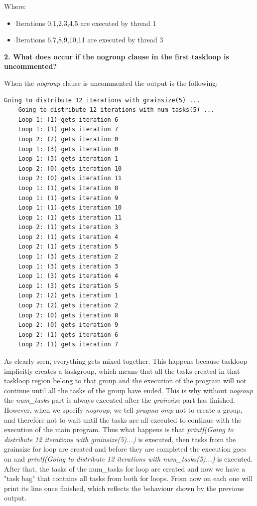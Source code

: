 \documentclass[12]{article}
\begin{document}
\begin{itemize}
    Where:
    \begin{itemize}
        \item Iterations 0,1,2,3,4,5 are executed by thread 1
        \item Iterations 6,7,8,9,10,11 are executed by thread 3
    \end{itemize}
\end{itemize}

\textbf{2. What does occur if the nogroup clause in the first taskloop is uncommented?}

When the \textit{nogroup} clause is uncommented the output is the following:

\begin{lstlisting}[frame=single]
    Going to distribute 12 iterations with grainsize(5) ...
    Going to distribute 12 iterations with num_tasks(5) ...
    Loop 1: (1) gets iteration 6
    Loop 1: (1) gets iteration 7
    Loop 2: (2) gets iteration 0
    Loop 1: (3) gets iteration 0
    Loop 1: (3) gets iteration 1
    Loop 2: (0) gets iteration 10
    Loop 2: (0) gets iteration 11
    Loop 1: (1) gets iteration 8
    Loop 1: (1) gets iteration 9
    Loop 1: (1) gets iteration 10
    Loop 1: (1) gets iteration 11
    Loop 2: (1) gets iteration 3
    Loop 2: (1) gets iteration 4
    Loop 2: (1) gets iteration 5
    Loop 1: (3) gets iteration 2
    Loop 1: (3) gets iteration 3
    Loop 1: (3) gets iteration 4
    Loop 1: (3) gets iteration 5
    Loop 2: (2) gets iteration 1
    Loop 2: (2) gets iteration 2
    Loop 2: (0) gets iteration 8
    Loop 2: (0) gets iteration 9
    Loop 2: (1) gets iteration 6
    Loop 2: (1) gets iteration 7
\end{lstlisting}

As clearly seen, everything gets mixed together. This happens because taskloop implicitly creates a taskgroup, which means that all the tasks created in that taskloop region belong to that group and the execution of the program will not continue until all the tasks of the group have ended. This is why without \textit{nogroup} the \textit{num\_tasks} part is always executed after the \textit{grainsize} part has finished. \\

However, when we specify \textit{nogroup}, we tell \textit{pragma omp} not to create a group, and therefore not to wait until the tasks are all executed to continue with the execution of the main program. Thus what happens is that \textit{printf(Going to distribute 12 iterations with grainsize(5)...)} is executed, then tasks from the grainsize for loop are created and before they are completed the execution goes on and \textit{printf(Going to distribute 12 iterations with num\_tasks(5)...)} is executed. After that, the tasks of the num\_tasks for loop are created and now we have a "task bag" that contains all tasks from both for loops. From now on each one will print its line once finished, which reflects the behaviour shown by the previous output.
\end{document}
